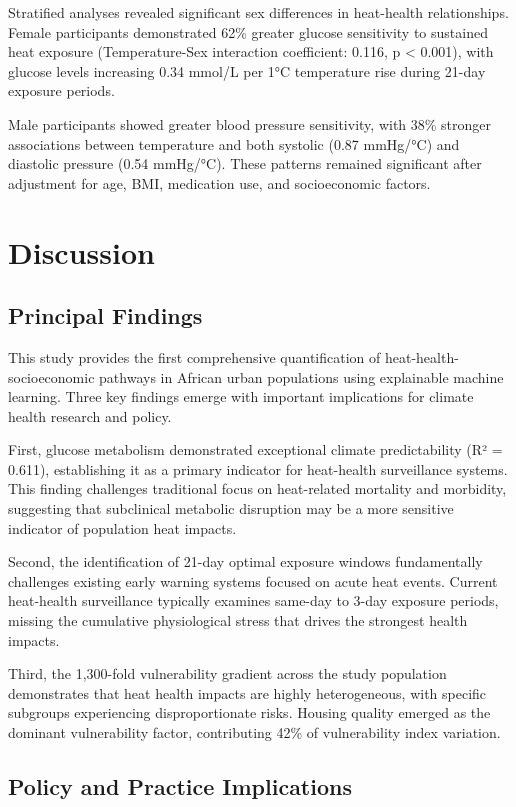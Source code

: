 \documentclass[11pt,a4paper]{article}
\begin{document}
Stratified analyses revealed significant sex differences in heat-health relationships. Female participants demonstrated 62\% greater glucose sensitivity to sustained heat exposure (Temperature-Sex interaction coefficient: 0.116, p < 0.001), with glucose levels increasing 0.34 mmol/L per 1°C temperature rise during 21-day exposure periods.

Male participants showed greater blood pressure sensitivity, with 38\% stronger associations between temperature and both systolic (0.87 mmHg/°C) and diastolic pressure (0.54 mmHg/°C). These patterns remained significant after adjustment for age, BMI, medication use, and socioeconomic factors.

\section{Discussion}

\subsection{Principal Findings}

This study provides the first comprehensive quantification of heat-health-socioeconomic pathways in African urban populations using explainable machine learning. Three key findings emerge with important implications for climate health research and policy.

First, glucose metabolism demonstrated exceptional climate predictability (R² = 0.611), establishing it as a primary indicator for heat-health surveillance systems. This finding challenges traditional focus on heat-related mortality and morbidity, suggesting that subclinical metabolic disruption may be a more sensitive indicator of population heat impacts.

Second, the identification of 21-day optimal exposure windows fundamentally challenges existing early warning systems focused on acute heat events. Current heat-health surveillance typically examines same-day to 3-day exposure periods, missing the cumulative physiological stress that drives the strongest health impacts.

Third, the 1,300-fold vulnerability gradient across the study population demonstrates that heat health impacts are highly heterogeneous, with specific subgroups experiencing disproportionate risks. Housing quality emerged as the dominant vulnerability factor, contributing 42\% of vulnerability index variation.

\subsection{Policy and Practice Implications}
\end{document}
